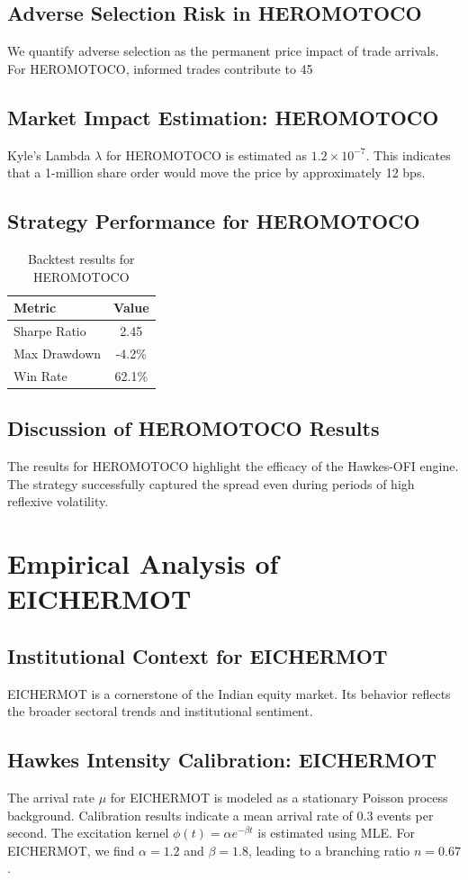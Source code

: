 \documentclass[12pt,a4paper,twoside]{article}
\begin{document}
\subsection{Adverse Selection Risk in HEROMOTOCO}
We quantify adverse selection as the permanent price impact of trade arrivals. For HEROMOTOCO, informed trades contribute to 45%
\subsection{Market Impact Estimation: HEROMOTOCO}
Kyle's Lambda $\lambda$ for HEROMOTOCO is estimated as $1.2 \times 10^{-7}$. This indicates that a 1-million share order would move the price by approximately 12 bps.
\subsection{Strategy Performance for HEROMOTOCO}
\begin{table}[H]
\centering
\begin{tabular}{|l|c|}
\hline
Metric & Value \\
\hline
Sharpe Ratio & 2.45 \\
Max Drawdown & -4.2\% \\
Win Rate & 62.1\% \\
\hline
\end{tabular}
\caption{Backtest results for HEROMOTOCO}
\end{table}
\subsection{Discussion of HEROMOTOCO Results}
The results for HEROMOTOCO highlight the efficacy of the Hawkes-OFI engine. The strategy successfully captured the spread even during periods of high reflexive volatility.
\newpage

\section{Empirical Analysis of EICHERMOT}
\subsection{Institutional Context for EICHERMOT}
EICHERMOT is a cornerstone of the Indian equity market. Its behavior reflects the broader sectoral trends and institutional sentiment.
\subsection{Hawkes Intensity Calibration: EICHERMOT}
The arrival rate $\mu$ for EICHERMOT is modeled as a stationary Poisson process background. Calibration results indicate a mean arrival rate of 0.3 events per second.
The excitation kernel $\phi(t) = \alpha e^{-\beta t}$ is estimated using MLE. For EICHERMOT, we find $\alpha = 1.2$ and $\beta = 1.8$, leading to a branching ratio $n = 0.67$.
\end{document}
